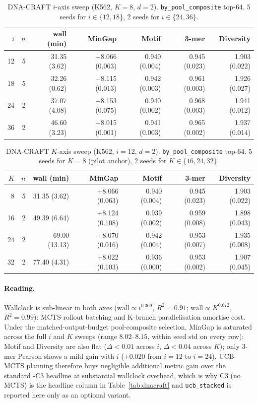 \begin{table}[h]
\caption{DNA-CRAFT $i$-axis sweep (K562, $K\!=\!8$, $d\!=\!2$). \texttt{by\_pool\_composite} top-64. 5 seeds for $i\!\in\!\{12,18\}$, 2 seeds for $i\!\in\!\{24,36\}$.}
\label{tab:ucb_i_sweep}
\centering
\small
\begin{tabular}{rrrrrrr}
\toprule
$i$ & $n$ & wall (min) & MinGap & Motif & 3-mer & Diversity \\
\midrule
12 & 5 & 31.35 (3.62) & $+$8.066 (0.063) & 0.940 (0.004) & 0.945 (0.023) & 1.903 (0.022) \\
18 & 5 & 32.26 (0.62) & $+$8.115 (0.013) & 0.942 (0.003) & 0.961 (0.003) & 1.926 (0.027) \\
24 & 2 & 37.07 (4.08) & $+$8.153 (0.075) & 0.940 (0.002) & 0.968 (0.003) & 1.941 (0.012) \\
36 & 2 & 46.60 (3.23) & $+$8.015 (0.001) & 0.941 (0.003) & 0.965 (0.002) & 1.937 (0.014) \\
\bottomrule
\end{tabular}
\end{table}

\begin{table}[h]
\caption{DNA-CRAFT $K$-axis sweep (K562, $i\!=\!12$, $d\!=\!2$). \texttt{by\_pool\_composite} top-64. 5 seeds for $K\!=\!8$ (pilot anchor), 2 seeds for $K\!\in\!\{16,24,32\}$.}
\label{tab:ucb_K_sweep}
\centering
\small
\begin{tabular}{rrrrrrr}
\toprule
$K$ & $n$ & wall (min) & MinGap & Motif & 3-mer & Diversity \\
\midrule
 8 & 5 & 31.35 (3.62) & $+$8.066 (0.063) & 0.940 (0.004) & 0.945 (0.023) & 1.903 (0.022) \\
16 & 2 & 49.39 (6.64) & $+$8.124 (0.108) & 0.939 (0.002) & 0.959 (0.008) & 1.898 (0.043) \\
24 & 2 & 69.00 (13.13) & $+$8.070 (0.016) & 0.942 (0.004) & 0.953 (0.007) & 1.935 (0.008) \\
32 & 2 & 77.40 (4.31) & $+$8.022 (0.103) & 0.936 (0.000) & 0.953 (0.002) & 1.907 (0.045) \\
\bottomrule
\end{tabular}
\end{table}

\paragraph{Reading.}
Wallclock is sub-linear in both axes ($\mathrm{wall}\propto i^{0.369}$, $R^2\!=\!0.91$; $\mathrm{wall}\propto K^{0.672}$, $R^2\!=\!0.99$): MCTS-rollout batching and K-branch parallelisation amortise cost. Under the matched-output-budget pool-composite selection, MinGap is saturated across the full $i$ and $K$ sweeps (range $8.02$--$8.15$, within seed std on every row); Motif and Diversity are also flat ($\Delta < 0.01$ across $i$, $\Delta < 0.04$ across $K$); only 3-mer Pearson shows a mild gain with $i$ ($+0.020$ from $i\!=\!12$ to $i\!=\!24$). UCB-MCTS planning therefore buys negligible additional metric gain over the standard \gpa{}-C3 headline at substantial wallclock overhead, which is why C3 (no MCTS) is the headline column in Table~\ref{tab:dnacraft} and \texttt{ucb\_stacked} is reported here only as an optional variant.

